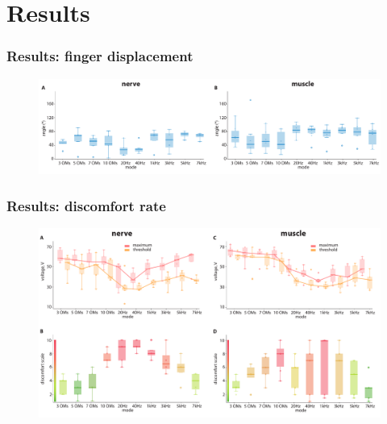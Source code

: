\documentclass[12pt, aspectratio=169]{beamer}
\begin{document}
\section{Results}
\begin{frame}
  \frametitle{Results: finger displacement}
  \begin{figure}
    \includegraphics[width=1.0\linewidth]{angles_all}
  \end{figure}
\end{frame}
\begin{frame}
  \frametitle{Results: discomfort rate}
  \begin{figure}
    \includegraphics[width=0.9\linewidth]{threshold_angle}
  \end{figure}
\end{frame}
\end{document}
